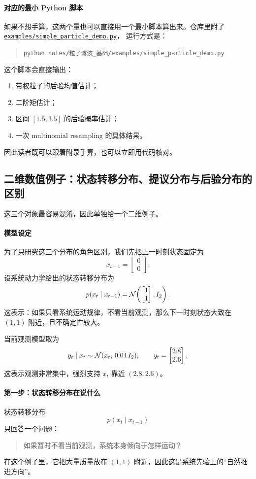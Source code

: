 \documentclass[12pt,a4paper]{ctexart}
\begin{document}
\paragraph{对应的最小 Python 脚本}
如果不想手算，这两个量也可以直接用一个最小脚本算出来。仓库里附了
\href{run:examples/simple_particle_demo.py}{\nolinkurl{examples/simple_particle_demo.py}}，
运行方式是：
\begin{quote}
\nolinkurl{python notes/粒子滤波_基础/examples/simple_particle_demo.py}
\end{quote}
这个脚本会直接输出：
\begin{enumerate}
  \item 带权粒子的后验均值估计；
  \item 二阶矩估计；
  \item 区间 \([1.5,3.5]\) 的后验概率估计；
  \item 一次 multinomial resampling 的具体结果。
\end{enumerate}
因此读者既可以跟着附录手算，也可以立即用代码核对。

\subsection{二维数值例子：状态转移分布、提议分布与后验分布的区别}\label{app:proposal-2d}

这三个对象最容易混淆，因此单独给一个二维例子。

\paragraph{模型设定}
为了只研究这三个分布的角色区别，我们先把上一时刻状态固定为
\[
x_{t-1} = \begin{bmatrix}0\\0\end{bmatrix}.
\]
设系统动力学给出的状态转移分布为
\[
p(x_t \mid x_{t-1})
= \mathcal{N}\!\left(
\begin{bmatrix}1\\1\end{bmatrix},
I_2
\right).
\]
这表示：如果只看系统运动规律，不看当前观测，那么下一时刻状态大致在 \((1,1)\) 附近，且不确定性较大。

当前观测模型取为
\[
y_t \mid x_t \sim \mathcal{N}(x_t,\,0.04\,I_2),
\qquad
y_t=
\begin{bmatrix}
2.8\\
2.6
\end{bmatrix}.
\]
这表示观测非常集中，强烈支持 \(x_t\) 靠近 \((2.8,2.6)\)。

\paragraph{第一步：状态转移分布在说什么}
状态转移分布
\[
p(x_t \mid x_{t-1})
\]
只回答一个问题：
\begin{quote}
如果暂时不看当前观测，系统本身倾向于怎样运动？
\end{quote}
在这个例子里，它把大量质量放在 \((1,1)\) 附近，因此这是系统先验上的“自然推进方向”。
\end{document}
